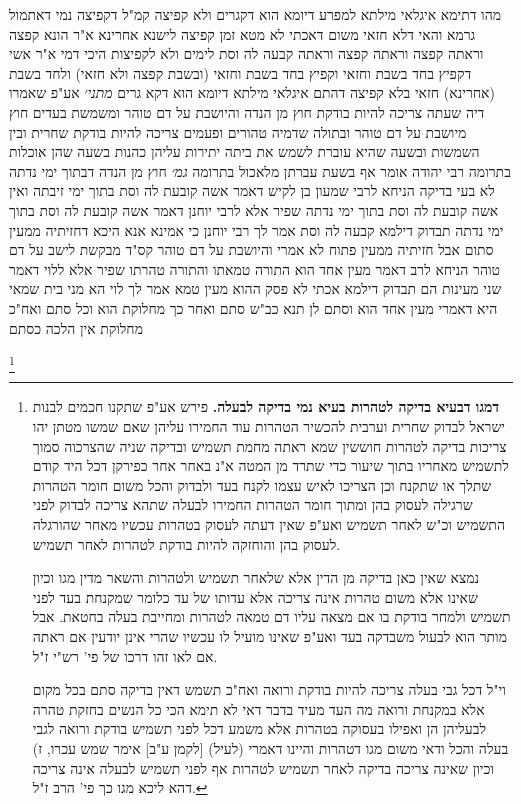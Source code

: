 \documentclass[12pt, openany]{book}
\newcommand{\footnotecomment}[1]{
	\renewcommand\thefootnote{}
	\footnote{#1}}
\newcommand{\commenta}[1]{\footnotecomment{#1}}
\begin{document}
{מהו דתימא איגלאי מילתא למפרע דיומא הוא דקגרים ולא קפיצה קמ"ל דקפיצה נמי דאתמול גרמא והאי דלא חזאי משום דאכתי לא מטא זמן קפיצה 
לישנא אחרינא א"ר הונא קפצה וראתה קפצה וראתה קפצה וראתה קבעה לה וסת לימים ולא לקפיצות היכי דמי א"ר אשי דקפיץ בחד בשבת וחזאי וקפיץ בחד בשבת וחזאי (ובשבת קפצה ולא חזאי) ולחד בשבת (אחרינא) חזאי בלא קפיצה דהתם איגלאי מילתא דיומא הוא דקא גרים
{\large\emph{מתני׳}} אע"פ שאמרו דיה שעתה צריכה להיות בודקת חוץ מן הנדה והיושבת על דם טוהר
ומשמשת בעדים חוץ מיושבת על דם טוהר ובתולה שדמיה טהורים 
ופעמים צריכה להיות בודקת שחרית ובין השמשות ובשעה שהיא עוברת לשמש את ביתה יתירות עליהן כהנות בשעה שהן אוכלות בתרומה רבי יהודה אומר אף בשעת עברתן מלאכול בתרומה
{\large\emph{גמ׳}} חוץ מן הנדה דבתוך ימי נדתה לא בעי בדיקה 
הניחא לרבי שמעון בן לקיש דאמר אשה קובעת לה וסת בתוך ימי זיבתה ואין אשה קובעת לה וסת בתוך ימי נדתה שפיר אלא לרבי יוחנן דאמר אשה קובעת לה וסת בתוך ימי נדתה תבדוק דילמא קבעה לה וסת
 אמר לך רבי יוחנן כי אמינא אנא היכא דחזיתיה ממעין סתום אבל חזיתיה ממעין פתוח לא אמרי
והיושבת על דם טוהר קס"ד מבקשת לישב על דם טוהר 
הניחא לרב דאמר מעין אחד הוא התורה טמאתו והתורה טהרתו שפיר
אלא ללוי דאמר שני מעינות הם תבדוק דילמא אכתי לא פסק ההוא מעין טמא אמר לך לוי הא מני
בית שמאי היא דאמרי מעין אחד הוא וסתם לן תנא כב"ש סתם ואחר כך מחלוקת הוא וכל סתם ואח"כ מחלוקת אין הלכה כסתם 
\commenta{\textbf{דמגו דבעיא בדיקה לטהרות בעיא נמי בדיקה לבעלה.} פירש אע"פ שתקנו חכמים לבנות ישראל לבדוק שחרית וערבית להכשיר הטהרות עוד החמירו עליהן שאם שמשו מטתן יהו צריכות בדיקה לטהרות חוששין שמא ראתה מחמת תשמיש ובדיקה שניה שהצרכוה סמוך לתשמיש מאחריו בתוך שיעור כדי שתרד מן המטה א"נ באחר אחר כפירקן דכל היד קודם שתלך או שתקנח וכן הצריכו לאיש עצמו לקנח בעד ולבדוק והכל משום חומר הטהרות שרגילה לעסוק בהן ומתוך חומר הטהרות החמירו לבעלה שתהא צריכה לבדוק לפני התשמיש וכ"ש לאחר תשמיש ואע"פ שאין דעתה לעסוק בטהרות עכשיו מאחר שהורגלה לעסוק בהן והוחזקה להיות בודקת לטהרות לאחר תשמיש.\par נמצא שאין כאן בדיקה מן הדין אלא שלאחר תשמיש ולטהרות והשאר מדין מגו וכיון שאינו אלא משום טהרות אינה צריכה אלא עדותו של עד כלומר שמקנחת בעד לפני תשמיש ולמחר בודקת בו אם מצאה עליו דם טמאה לטהרות ומחייבת בעלה בחטאת. אבל מותר הוא לבעול משבדקה בעד ואע"פ שאינו מועיל לו עכשיו שהרי אינן יודעין אם ראתה אם לאו זהו דרכו של פי' רש"י ז"ל.\par וי"ל דכל גבי בעלה צריכה להיות בודקת ורואה ואח"כ תשמש דאין בדיקה סתם בכל מקום אלא במקנחת ורואה מה העד מעיד בדבר דאי לא תימא הכי כל הנשים בחזקת טהרה לבעליהן הן ואפילו בעסוקה בטהרות אלא משמע דכל לפני תשמיש בודקת ורואה לגבי בעלה והכל ודאי משום מגו דטהרות והיינו דאמרי (לעיל) [לקמן ע"ב] אימר שמש עכרו, ז) וכיון שאינה צריכה בדיקה לאחר תשמיש לטהרות אף לפני תשמיש לבעלה אינה צריכה דהא ליכא מגו כך פי' הרב ז"ל. }
}
\end{document}
